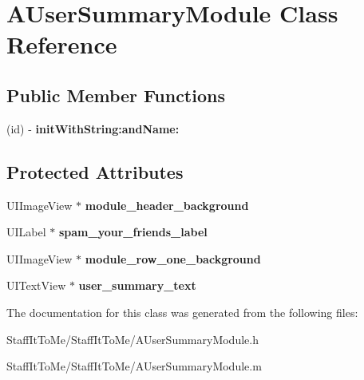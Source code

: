\hypertarget{interface_a_user_summary_module}{
\section{\-A\-User\-Summary\-Module \-Class \-Reference}
\label{interface_a_user_summary_module}
}
\subsection*{\-Public \-Member \-Functions}
\begin{DoxyCompactItemize}
\item 
\hypertarget{interface_a_user_summary_module_aa698f4d428f1fee73832fe8958d8ab23}{
(id) -\/ {\bfseries init\-With\-String\-:and\-Name\-:}}
\label{interface_a_user_summary_module_aa698f4d428f1fee73832fe8958d8ab23}

\end{DoxyCompactItemize}
\subsection*{\-Protected \-Attributes}
\begin{DoxyCompactItemize}
\item 
\hypertarget{interface_a_user_summary_module_a8b08e0aa29288c54015df18540f302c2}{
\-U\-I\-Image\-View $\ast$ {\bfseries module\-\_\-header\-\_\-background}}
\label{interface_a_user_summary_module_a8b08e0aa29288c54015df18540f302c2}

\item 
\hypertarget{interface_a_user_summary_module_afd9d620570e61c0f317f3070fbf26844}{
\-U\-I\-Label $\ast$ {\bfseries spam\-\_\-your\-\_\-friends\-\_\-label}}
\label{interface_a_user_summary_module_afd9d620570e61c0f317f3070fbf26844}

\item 
\hypertarget{interface_a_user_summary_module_af3ac911a4ebb7e50d769aa6d8a2cb10d}{
\-U\-I\-Image\-View $\ast$ {\bfseries module\-\_\-row\-\_\-one\-\_\-background}}
\label{interface_a_user_summary_module_af3ac911a4ebb7e50d769aa6d8a2cb10d}

\item 
\hypertarget{interface_a_user_summary_module_ac4fc925804ee30b6a72e3c0ec58f71bc}{
\-U\-I\-Text\-View $\ast$ {\bfseries user\-\_\-summary\-\_\-text}}
\label{interface_a_user_summary_module_ac4fc925804ee30b6a72e3c0ec58f71bc}

\end{DoxyCompactItemize}


\-The documentation for this class was generated from the following files\-:\begin{DoxyCompactItemize}
\item 
\-Staff\-It\-To\-Me/\-Staff\-It\-To\-Me/\-A\-User\-Summary\-Module.\-h\item 
\-Staff\-It\-To\-Me/\-Staff\-It\-To\-Me/\-A\-User\-Summary\-Module.\-m\end{DoxyCompactItemize}
